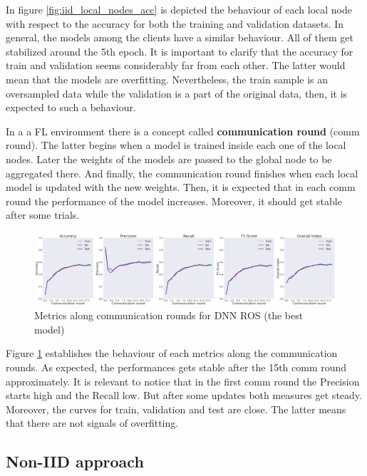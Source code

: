 In figure \ref{fig:iid_local_nodes_acc} is depicted the behaviour of each local node with respect to the accuracy for both the training and validation datasets. In general, the models among the clients have a similar behaviour. All of them get stabilized around the 5th epoch. It is important to clarify that the accuracy for train and validation seems considerably far from each other. The latter would mean that the models are overfitting. Nevertheless, the train sample is an oversampled data while the validation is a part of the original data, then, it is expected to such a behaviour.

In a a FL environment there is a concept called \textbf{communication round} (comm round). The latter begins when a model is trained inside each one of the local nodes. Later the weights of the models are passed to the global node to be aggregated there. And finally, the communication round finishes when each local model is updated with the new weights. Then, it is expected that in each comm round the performance of the model increases. Moreover, it should get stable after some trials.

\begin{figure}[H]
\centering
\includegraphics[scale=0.4]{img/comm_round_metrics_DNNROS.png}
\caption{Metrics along communication rounds for DNN ROS (the best model)}
\label{fig:comm_round_metrics_DNNROS}
\end{figure}

Figure \ref{fig:comm_round_metrics_DNNROS} establishes the behaviour of each metrics along the communication rounds. As expected, the performances gets stable after the 15th comm round approximately. It is relevant to notice that in the first comm round the Precision starts high and the Recall low. But after some updates both measures get steady. Moreover, the curves for train, validation and test are close. The latter means that there are not signals of overfitting.

\subsection{Non-IID approach}

